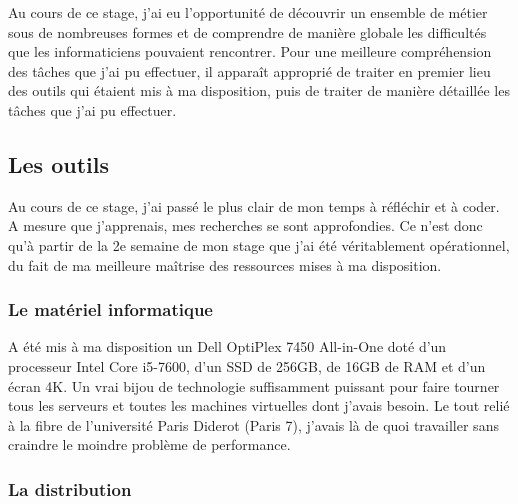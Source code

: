 \documentclass{article}
\begin{document}
Au cours de ce stage, j’ai eu l’opportunité de découvrir un ensemble de métier sous de nombreuses formes et de comprendre de manière globale les difficultés que les informaticiens pouvaient rencontrer. Pour une meilleure compréhension des tâches que j’ai pu effectuer, il apparaît approprié de traiter en premier lieu des outils qui étaient mis à ma disposition, puis de traiter de manière détaillée les tâches que j’ai pu effectuer.

\subsection{Les outils}

Au cours de ce stage, j’ai passé le plus clair de mon temps à réfléchir et à coder. A mesure que j’apprenais, mes recherches se sont approfondies. Ce n’est donc qu’à partir de la 2e semaine de mon stage que j’ai été véritablement opérationnel, du fait de ma meilleure maîtrise des ressources mises à ma disposition.

\subsubsection{Le matériel informatique}

A été mis à ma disposition un Dell OptiPlex 7450 All-in-One doté d'un processeur Intel Core i5-7600, d'un SSD de 256GB, de 16GB de RAM et d'un écran 4K. Un vrai bijou de technologie suffisamment puissant pour faire tourner tous les serveurs et toutes les machines virtuelles dont j'avais besoin.
Le tout relié à la fibre de l'université Paris Diderot (Paris 7), j'avais là de quoi travailler sans craindre le moindre problème de performance.

\subsubsection{La distribution}
\end{document}
